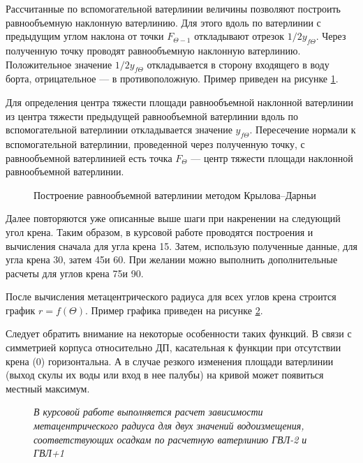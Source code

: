Рассчитанные по вспомогательной ватерлинии величины позволяют построить равнообъемную наклонную ватерлинию.
Для этого вдоль по ватерлинии с предыдущим углом наклона от точки $F_{\Theta-1}$ откладывают отрезок $1/2y_{f\Theta}$.
Через полученную точку проводят равнообъемную наклонную ватерлинию.
Положительное значение $1/2y_{f\Theta}$ откладывается в сторону входящего в воду борта, отрицательное --- в противоположную.
Пример приведен на рисунке \ref{fig:kryloff-darny-large}.

Для определения центра тяжести площади равнообъемной наклонной ватерлинии из центра тяжести предыдущей равнообъемной ватерлинии вдоль по вспомогательной ватерлинии откладывается значение $y_{f\Theta}$.
Пересечение нормали к вспомогательной ватерлинии, проведенной через полученную точку, с равнообъемной ватерлинией есть точка $F_{\Theta}$ --- центр тяжести площади наклонной равнообъемной ватерлинии.

\begin{figure}[h!]
    \centerline{}
    \caption{Построение равнообъемной ватерлинии методом Крылова–Дарньи}
    \label{fig:kryloff-darny-large}
\end{figure}

Далее повторяются уже описанные выше шаги при накренении на следующий угол крена.
Таким образом, в курсовой работе проводятся построения и вычисления сначала для угла крена 15\textdegree.
Затем, использую полученные данные, для угла крена 30\textdegree, затем 45\textdegree и 60\textdegree.
При желании можно выполнить дополнительные расчеты для углов крена 75\textdegree и 90\textdegree.

После вычисления метацентрического радиуса для всех углов крена строится график $r=f(\Theta)$.
Пример графика приведен на рисунке \ref{fig:metacentric-radius-heel}.

Следует обратить внимание на некоторые особенности таких функций.
В связи с симметрией корпуса относительно ДП, касательная к функции при отсутствии крена (0\textdegree) горизонтальна.
А в случае резкого изменения площади ватерлинии (выход скулы их воды или вход в нее палубы) на кривой может появиться местный максимум.

\begin{figure}[h!]
    \centerline{}
    \caption{Зависимость метацентрического радиуса от угла крена}
    \caption*{\textit{В курсовой работе выполняется расчет зависимости метацентрического радиуса для двух значений водоизмещения, соответствующих осадкам по расчетную ватерлинию ГВЛ-2 и ГВЛ+1}}
    \label{fig:metacentric-radius-heel}
\end{figure}

